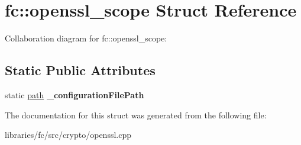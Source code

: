 \hypertarget{structfc_1_1openssl__scope}{}\section{fc\+:\+:openssl\+\_\+scope Struct Reference}
\label{structfc_1_1openssl__scope}


Collaboration diagram for fc\+:\+:openssl\+\_\+scope\+:
\subsection*{Static Public Attributes}
\begin{DoxyCompactItemize}
\item 
\mbox{\label{structfc_1_1openssl__scope_a69bf64c2c9b2702535361382a83f98af}} 
static \mbox{\hyperlink{classfc_1_1path}{path}} {\bfseries \+\_\+configuration\+File\+Path}
\end{DoxyCompactItemize}


The documentation for this struct was generated from the following file\+:\begin{DoxyCompactItemize}
\item 
libraries/fc/src/crypto/openssl.\+cpp\end{DoxyCompactItemize}
